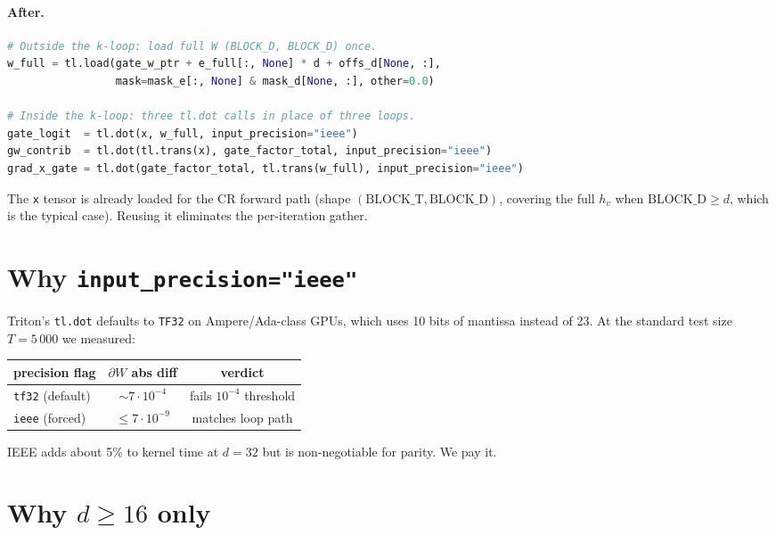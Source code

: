 \documentclass[11pt,a4paper]{article}
\begin{document}
\paragraph{After.}
\begin{lstlisting}[language=Python]
# Outside the k-loop: load full W (BLOCK_D, BLOCK_D) once.
w_full = tl.load(gate_w_ptr + e_full[:, None] * d + offs_d[None, :],
                 mask=mask_e[:, None] & mask_d[None, :], other=0.0)

# Inside the k-loop: three tl.dot calls in place of three loops.
gate_logit  = tl.dot(x, w_full, input_precision="ieee")
gw_contrib  = tl.dot(tl.trans(x), gate_factor_total, input_precision="ieee")
grad_x_gate = tl.dot(gate_factor_total, tl.trans(w_full), input_precision="ieee")
\end{lstlisting}

The \texttt{x} tensor is already loaded for the CR forward path
(shape $(\mathrm{BLOCK\_T}, \mathrm{BLOCK\_D})$, covering the full
$h_v$ when $\mathrm{BLOCK\_D} \ge d$, which is the typical case).
Reusing it eliminates the per-iteration gather.

\section{Why \texttt{input\_precision="ieee"}}

Triton's \texttt{tl.dot} defaults to \texttt{TF32} on Ampere/Ada-class
GPUs, which uses 10 bits of mantissa instead of 23. At the standard
test size $T = 5\,000$ we measured:

\begin{center}
\begin{tabular}{l c c}
\toprule
\textbf{precision flag} & \textbf{$\partial W$ abs diff} & \textbf{verdict} \\
\midrule
\texttt{tf32} (default) & $\sim 7\!\cdot\!10^{-4}$ & fails $10^{-4}$ threshold \\
\texttt{ieee} (forced)  & $\le 7\!\cdot\!10^{-9}$  & matches loop path \\
\bottomrule
\end{tabular}
\end{center}

IEEE adds about 5\% to kernel time at $d = 32$ but is non-negotiable
for parity. We pay it.

\section{Why $d \ge 16$ only}
\end{document}
